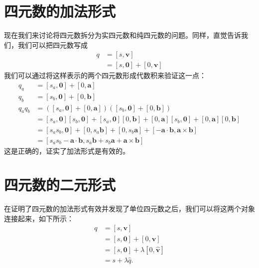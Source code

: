 \section{四元数的加法形式}
现在我们来讨论将四元数拆分为实四元数和纯四元数的问题。同样，直觉告诉我们，我们可以把四元数写成
$$
    \begin{aligned}
        q & =[s, \mathbf{v}]                 \\
          & =[s, \mathbf{0}]+[0, \mathbf{v}]
    \end{aligned}
$$
我们可以通过将这样表示的两个四元数形成代数积来验证这一点：
$$
    \begin{aligned}
        q_{a}       & =\left[s_{a}, \mathbf{0}\right]+[0, \mathbf{a}]                                                                                                                                          \\
        q_{b}       & =\left[s_{b}, \mathbf{0}\right]+[0, \mathbf{b}]                                                                                                                                          \\
        q_{a} q_{b} & =\left(\left[s_{a}, \mathbf{0}\right]+[0, \mathbf{a}]\right)\left(\left[s_{b}, \mathbf{0}\right]+[0, \mathbf{b}]\right)                                                                  \\
                    & =\left[s_{a}, \mathbf{0}\right]\left[s_{b}, \mathbf{0}\right]+\left[s_{a}, \mathbf{0}\right][0, \mathbf{b}]+[0, \mathbf{a}]\left[s_{b}, \mathbf{0}\right]+[0, \mathbf{a}][0, \mathbf{b}] \\
                    & =\left[s_{a} s_{b}, \mathbf{0}\right]+\left[0, s_{a} \mathbf{b}\right]+\left[0, s_{b} \mathbf{a}\right]+[-\mathbf{a} \cdot \mathbf{b}, \mathbf{a} \times \mathbf{b}]                     \\
                    & =\left[s_{a} s_{b}-\mathbf{a} \cdot \mathbf{b}, s_{a} \mathbf{b}+s_{b} \mathbf{a}+\mathbf{a} \times \mathbf{b}\right]
    \end{aligned}
$$
这是正确的，证实了加法形式是有效的。

\section{四元数的二元形式}
在证明了四元数的加法形式有效并发现了单位四元数之后，我们可以将这两个对象连接起来，如下所示：
$$
    \begin{aligned}
        q & =[s, \mathbf{v}]                              \\
          & =[s, \mathbf{0}]+[0, \mathbf{v}]              \\
          & =[s, \mathbf{0}]+\lambda[0, \hat{\mathbf{v}}] \\
          & =s+\lambda \hat{q} .
    \end{aligned}
$$

